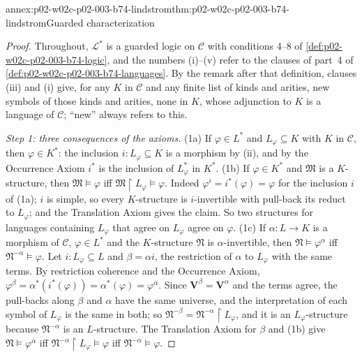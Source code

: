 \begin{annexitem}{annex:p02-w02c-p02-003-b74-lindstrom}{thm:p02-w02c-p02-003-b74-lindstrom}{Guarded characterization}
\begin{proof}
Throughout, \(\mathcal L^{\ast}\) is a guarded logic on \(\mathcal C\) with
conditions 4--8 of \cref{def:p02-w02c-p02-003-b74-logic}, and the numbers
(i)--(v) refer to the clauses of part~4 of
\cref{def:p02-w02c-p02-003-b74-languages}.  By the remark after that
definition, clauses (iii) and (i) give, for any \(K\) in \(\mathcal C\) and
any finite list of kinds and arities, new symbols of those kinds and
arities, none in \(K\), whose adjunction to \(K\) is a language of
\(\mathcal C\); ``new'' always refers to this.

\emph{Step 1: three consequences of the axioms.}
(1a) If \(\varphi\in L^{\ast}\) and \(L_\varphi\subseteq K\) with \(K\) in
\(\mathcal C\), then \(\varphi\in K^{\ast}\): the inclusion
\(i:L_\varphi\subseteq K\) is a morphism by (ii), and by the Occurrence Axiom
\(i^{\ast}\) is the inclusion of \(L_\varphi^{\ast}\) in \(K^{\ast}\).
(1b) If \(\varphi\in K^{\ast}\) and \(\mathfrak M\) is a \(K\)-structure,
then \(\mathfrak M\models\varphi\) iff
\(\mathfrak M\restriction L_\varphi\models\varphi\).  Indeed
\(\varphi^{i}=i^{\ast}(\varphi)=\varphi\) for the inclusion \(i\) of (1a);
\(i\) is simple, so every \(K\)-structure is \(i\)-invertible with
pull-back its reduct to \(L_\varphi\); and the Translation Axiom gives the
claim.  So two structures for languages containing \(L_\varphi\) that agree
on \(L_\varphi\) agree on \(\varphi\).
(1c) If \(\alpha:L\to K\) is a morphism of \(\mathcal C\),
\(\varphi\in L^{\ast}\) and the \(K\)-structure \(\mathfrak N\) is
\(\alpha\)-invertible, then \(\mathfrak N\models\varphi^{\alpha}\) iff
\(\mathfrak N^{-\alpha}\models\varphi\).  Let \(i:L_\varphi\subseteq L\) and
\(\beta=\alpha i\), the restriction of \(\alpha\) to \(L_\varphi\) with the
same terms.  By restriction coherence and the Occurrence Axiom,
\(\varphi^{\beta}=\alpha^{\ast}(i^{\ast}(\varphi))=\alpha^{\ast}(\varphi)=\varphi^{\alpha}\).
Since \(\mathbf V^{\beta}=\mathbf V^{\alpha}\) and the terms agree, the
pull-backs along \(\beta\) and \(\alpha\) have the same universe, and the
interpretation of each symbol of \(L_\varphi\) is the same in both; so
\(\mathfrak N^{-\beta}=\mathfrak N^{-\alpha}\restriction L_\varphi\), and it
is an \(L_\varphi\)-structure because \(\mathfrak N^{-\alpha}\) is an
\(L\)-structure.  The Translation Axiom for \(\beta\) and (1b) give
\(\mathfrak N\models\varphi^{\alpha}\) iff
\(\mathfrak N^{-\alpha}\restriction L_\varphi\models\varphi\) iff
\(\mathfrak N^{-\alpha}\models\varphi\).


\end{proof}
\end{annexitem}
